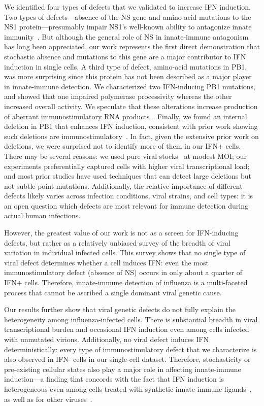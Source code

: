 \documentclass[lineno]{asm-article}
\begin{document}
We identified four types of defects that we validated to increase IFN induction. 
Two types of defects---absence of the NS gene and amino-acid mutations to the NS1 protein---presumably impair NS1's well-known ability to antagonize innate immunity~\cite{garcia1998influenza, hale2008multifunctional}.
But although the general role of NS in innate-immune antagonism has long been appreciated, our work represents the first direct demonstration that stochastic absence and mutations to this gene are a major contributor to IFN induction in single cells.
A third type of defect, amino-acid mutations in PB1, was more surprising since this protein has not been described as a major player in innate-immune detection.
We characterized two IFN-inducing PB1 mutations, and showed that one impaired polymerase processivity whereas the other increased overall activity.
We speculate that these alterations increase production of aberrant immunostimulatory RNA products~\cite{velthuis2018mini}.
Finally, we found an internal deletion in PB1 that enhances IFN induction, consistent with prior work showing such deletions are immunostimulatory~\cite{baum2010preference, tapia2013defective, boergeling2015evidence, dimmock2015cloned, liu2019inhibition}.
In fact, given the extensive prior work on deletions, we were surprised not to identify more of them in our IFN+ cells.
There may be several reasons: we used pure viral stocks~\cite{xue2016propagation} at modest MOI; our experiments preferentially captured cells with higher viral transcriptional load; and most prior studies have used techniques that can detect large deletions but not subtle point mutations.
Additionally, the relative importance of different defects likely varies across infection conditions, viral strains, and cell types: it is an open question which defects are most relevant for immune detection during actual human infections.

However, the greatest value of our work is not as a screen for IFN-inducing defects, but rather as a relatively unbiased survey of the breadth of viral variation in individual infected cells.
This survey shows that no single type of viral defect determines whether a cell induces IFN: even the most immunostimulatory defect (absence of NS) occurs in only about a quarter of IFN+ cells.
Therefore, innate-immune detection of influenza is a multi-faceted process that cannot be ascribed a single dominant viral genetic cause.   

Our results further show that viral genetic defects do not fully explain the heterogeneity among influenza-infected cells.
There is substantial breadth in viral transcriptional burden and occasional IFN induction even among cells infected with unmutated virions.
Additionally, no viral defect induces IFN deterministically: every type of immunostimulatory defect that we characterize is also observed in IFN- cells in our single-cell dataset.
Therefore, stochasticity or pre-existing cellular states also play a major role in affecting innate-immune induction---a finding that concords with the fact that IFN induction is heterogeneous even among cells treated with synthetic innate-immune ligands~\cite{shalek2013single, shalek2014single, wimmers2018single, bhushal2017cell}, as well as for other viruses~\cite{oneal2018west}.
\end{document}
